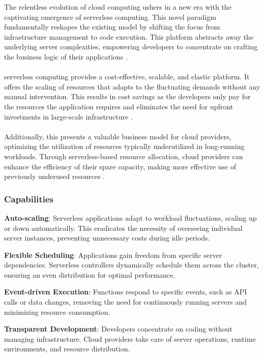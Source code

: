 The relentless evolution of cloud computing ushers in a new era with the captivating emergence of serverless computing. This novel paradigm fundamentally reshapes the existing model by shifting the focus from infrastructure management to code execution. This platform abstracts away the underlying server complexities, empowering developers to concentrate on crafting the business logic of their applications \cite{Baldini17, SA20}.\\\\
serverless computing provides a cost-effective, scalable, and elastic platform. It offers the scaling of resources that adapts to the fluctuating demands without any manual intervention. This results in cost savings as the developers only pay for the resources the application requires and eliminates the need for upfront investments in large-scale infrastructure \cite{CIM+19}.\\\\ Additionally, this presents a valuable business model for cloud providers, optimizing the utilization of resources typically underutilized in long-running workloads. Through serverless-based resource allocation, cloud providers can enhance the efficiency of their spare capacity, making more effective use of previously underused resources \cite{TCBR21}.\\
\subsubsection{Capabilities}

\textbf{Auto-scaling}: Serverless applications adapt to workload fluctuations, scaling up or down automatically. This eradicates the necessity of overseeing individual server instances, preventing unnecessary costs during idle periods.

\textbf{Flexible Scheduling}: Applications gain freedom from specific server dependencies. Serverless controllers dynamically schedule them across the cluster, ensuring an even distribution for optimal performance.

\textbf{Event-driven Execution}: Functions respond to specific events, such as API calls or data changes, removing the need for continuously running servers and minimizing resource consumption.

\textbf{Transparent Development}: Developers concentrate on coding without managing infrastructure. Cloud providers take care of server operations, runtime environments, and resource distribution.

